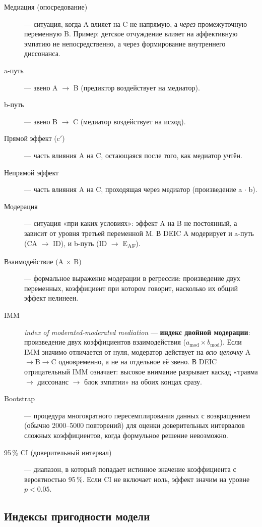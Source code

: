 \begin{description}
    \item[Медиация (опосредование)] --- ситуация, когда A влияет на C не напрямую, а \emph{через} промежуточную переменную B. Пример: детское отчуждение влияет на аффективную эмпатию не непосредственно, а через формирование внутреннего диссонанса.
    \item[a-путь] --- звено A $\to$ B (предиктор воздействует на медиатор).
    \item[b-путь] --- звено B $\to$ C (медиатор воздействует на исход).
    \item[Прямой эффект (c$'$)] --- часть влияния A на C, остающаяся после того, как медиатор учтён.
    \item[Непрямой эффект] --- часть влияния A на C, проходящая через медиатор (произведение a $\cdot$ b).
    \item[Модерация] --- ситуация «при каких условиях»: эффект A на B не постоянный, а зависит от уровня третьей переменной M. В DEIC A модерирует и a-путь (CA $\to$ ID), и b-путь (ID $\to$ E\textsubscript{AF}).
    \item[Взаимодействие (A $\times$ B)] --- формальное выражение модерации в регрессии: произведение двух переменных, коэффициент при котором говорит, насколько их общий эффект нелинеен.
    \item[IMM] \textit{index of moderated-moderated mediation} --- \textbf{индекс двойной модерации}: произведение двух коэффициентов взаимодействия ($a_{\text{mod}} \times b_{\text{mod}}$). Если IMM значимо отличается от нуля, модератор действует на \emph{всю цепочку} A$\to$B$\to$C одновременно, а не на отдельное её звено. В DEIC отрицательный IMM означает: высокое внимание разрывает каскад «травма $\to$ диссонанс $\to$ блок эмпатии» на обоих концах сразу.
    \item[Bootstrap] --- процедура многократного пересемплирования данных с возвращением (обычно 2000--5000 повторений) для оценки доверительных интервалов сложных коэффициентов, когда формульное решение невозможно.
    \item[95\,\% CI (доверительный интервал)] --- диапазон, в который попадает истинное значение коэффициента с вероятностью 95\,\%. Если CI не включает ноль, эффект значим на уровне $p < 0.05$.
\end{description}

\subsection*{Индексы пригодности модели}

